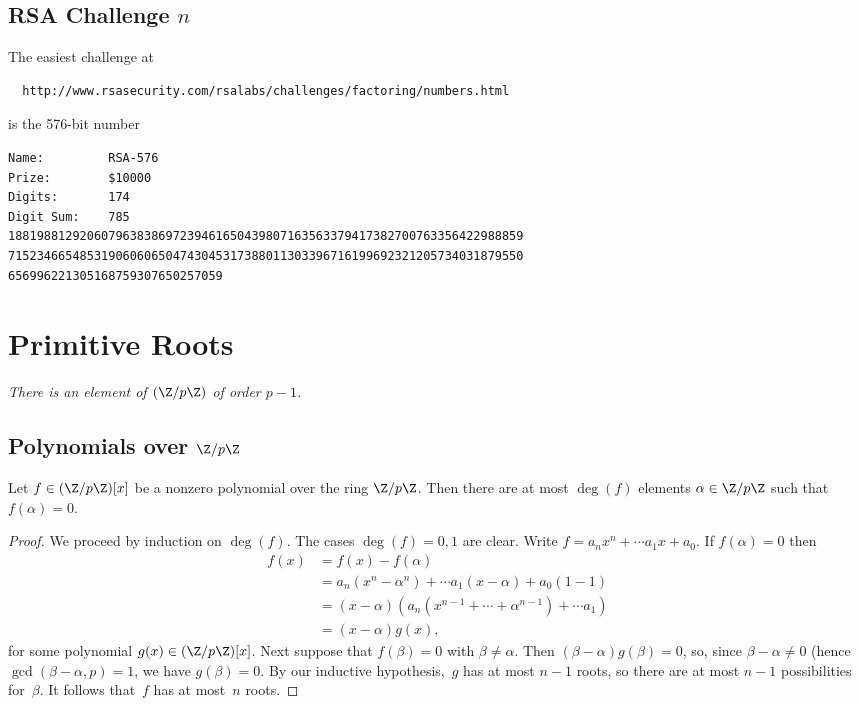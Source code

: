 \documentclass[11pt]{report}
\begin{document}
\section{RSA Challenge $n$}
The easiest challenge at
\begin{verbatim}
  http://www.rsasecurity.com/rsalabs/challenges/factoring/numbers.html
\end{verbatim}
is the 576-bit number
\begin{verbatim}
Name:         RSA-576
Prize:        $10000
Digits:       174
Digit Sum:    785
188198812920607963838697239461650439807163563379417382700763356422988859
715234665485319060606504743045317388011303396716199692321205734031879550
656996221305168759307650257059
\end{verbatim}







\chapter{Primitive Roots}



 {\em There is an element of $(\Z/p\Z)$ of order $p-1$.}

\section{Polynomials over $\Z/p\Z$}
\begin{proposition}\label{prop:atmost}
  Let $f\in(\Z/p\Z)[x]$ be a nonzero polynomial
  over the ring $\Z/p\Z$.  Then there are at most
  $\deg(f)$ elements $\alpha\in\Z/p\Z$ such that
  $f(\alpha)=0$.
\end{proposition}
\begin{proof}
  We proceed by induction on $\deg(f)$.  The cases
  $\deg(f)=0,1$ are clear.  Write
  $f = a_n x^n + \cdots a_1 x + a_0$.  If
  $f(\alpha)=0$ then
  \begin{align*}
    f(x) & = f(x) - f(\alpha)                                            \\
         & = a_n(x^n-\alpha^n) + \cdots a_1(x-\alpha) + a_0(1-1)         \\
         & = (x-\alpha)(a_n(x^{n-1}+\cdots + \alpha^{n-1}) + \cdots a_1) \\
         & = (x-\alpha)g(x),
  \end{align*}
  for some polynomial $g(x)\in(\Z/p\Z)[x]$.
  Next suppose that $f(\beta)=0$ with $\beta\neq \alpha$.  Then
  $(\beta-\alpha) g(\beta) = 0$, so, since $\beta-\alpha\neq 0$
  (hence $\gcd(\beta-\alpha, p)=1$, we have $g(\beta)=0$.
  By our inductive hypothesis,~$g$ has at most $n-1$ roots, so
  there are at most $n-1$ possibilities for~$\beta$.
  It follows that~$f$ has at most~$n$ roots.
\end{proof}
\end{document}
